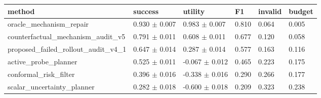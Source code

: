 \begin{tabular}{llllll}
\toprule
method & success & utility & F1 & invalid & budget \\
\midrule
oracle\_mechanism\_repair & 0.930 $\pm$ 0.007 & 0.983 $\pm$ 0.007 & 0.810 & 0.064 & 0.005 \\
counterfactual\_mechanism\_audit\_v5 & 0.791 $\pm$ 0.011 & 0.608 $\pm$ 0.011 & 0.677 & 0.120 & 0.058 \\
proposed\_failed\_rollout\_audit\_v4\_1 & 0.647 $\pm$ 0.014 & 0.287 $\pm$ 0.014 & 0.577 & 0.163 & 0.116 \\
active\_probe\_planner & 0.525 $\pm$ 0.011 & -0.067 $\pm$ 0.012 & 0.465 & 0.223 & 0.175 \\
conformal\_risk\_filter & 0.396 $\pm$ 0.016 & -0.338 $\pm$ 0.016 & 0.290 & 0.266 & 0.177 \\
scalar\_uncertainty\_planner & 0.282 $\pm$ 0.018 & -0.600 $\pm$ 0.018 & 0.209 & 0.323 & 0.238 \\
\bottomrule
\end{tabular}
